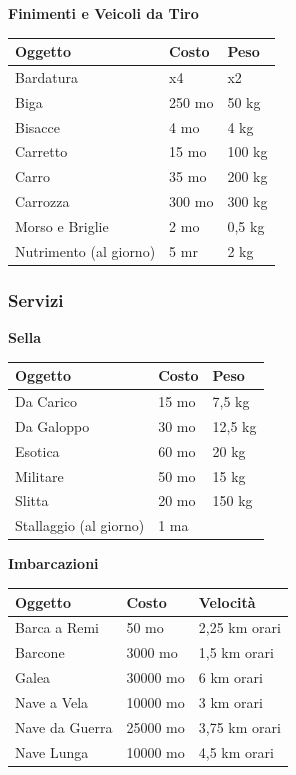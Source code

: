 \begin{multicols}{2}
\medskip

\textbf{Finimenti e Veicoli da Tiro}\label{Veicoli}\hypertarget{Veicoli}{}

\noindent\begin{tabularx}{\linewidth}{Xll}
\toprule
\rowcolor{gray!20}\textbf{Oggetto}&\textbf{Costo}&\textbf{Peso}\\
\toprule
Bardatura&x4&x2\\
\rowcolor{gray!20}Biga&250 mo&50 kg\\
Bisacce&4 mo&4 kg\\
\rowcolor{gray!20}Carretto&15 mo&100 kg\\
Carro&35 mo&200 kg\\
\rowcolor{gray!20}Carrozza&300 mo&300 kg\\
Morso e Briglie&2 mo&0,5 kg\\
\rowcolor{gray!20}Nutrimento (al giorno)&5 mr&2 kg
\end{tabularx}



\subsubsection{Servizi}

\textbf{Sella}

\noindent\begin{tabularx}{\linewidth}{Xll}
\toprule
\rowcolor{gray!20}\textbf{Oggetto}&\textbf{Costo}&\textbf{Peso}\\
\toprule
Da Carico&15 mo&7,5 kg\\
\rowcolor{gray!20}Da Galoppo&30 mo&12,5 kg\\
Esotica&60 mo&20 kg\\
\rowcolor{gray!20}Militare&50 mo&15 kg\\
Slitta&20 mo&150 kg\\
\rowcolor{gray!20}Stallaggio (al giorno)&1 ma&
\end{tabularx}

\medskip

\textbf{Imbarcazioni}\hypertarget{Imbarcazioni}{}

\noindent\begin{tabularx}{\linewidth}{Xll}
\toprule
\rowcolor{gray!20}\textbf{Oggetto}&\textbf{Costo}&\textbf{Velocità}\\
\toprule
Barca a Remi&50 mo&2,25 km orari\\
\rowcolor{gray!20}Barcone&3000 mo&1,5 km orari\\
Galea&30000 mo&6 km orari\\
\rowcolor{gray!20}Nave a Vela&10000 mo&3 km orari\\
Nave da Guerra&25000 mo&3,75 km orari\\
\rowcolor{gray!20}Nave Lunga&10000 mo&4,5 km orari
\end{tabularx}


\end{multicols}
